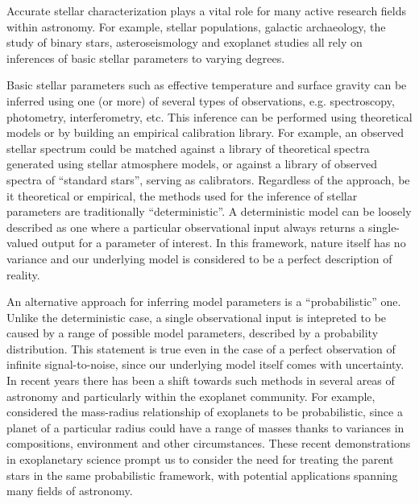 


Accurate stellar characterization plays a vital role for many active research
fields within astronomy.
For example, stellar populations, galactic archaeology, the study of binary
stars, asteroseismology and exoplanet studies all rely on inferences of basic
stellar parameters to varying degrees.

Basic stellar parameters such as effective temperature and surface gravity
can be inferred using one (or more) of several types of observations, e.g.
spectroscopy, photometry, interferometry, etc.
This inference can be performed using theoretical models or by building an
empirical calibration library.
For example, an observed stellar spectrum could be matched against a library of
theoretical spectra generated using stellar atmosphere models, or against a
library of observed spectra of ``standard stars'', serving as calibrators.
Regardless of the approach, be it theoretical or empirical, the methods used
for the inference of stellar parameters are traditionally ``deterministic''.
A deterministic model can be loosely described as one where a particular
observational input always returns a single-valued output for a parameter of
interest.
In this framework, nature itself has no variance and our underlying model is
considered to be a perfect description of reality.

An alternative approach for inferring model parameters is a ``probabilistic''
one.
Unlike the deterministic case, a single observational input is intepreted to be
caused by a range of possible model parameters, described by a probability
distribution.
This statement is true even in the case of a perfect observation of infinite
signal-to-noise, since our underlying model itself comes with uncertainty.
In recent years there has been a shift towards such methods in several areas of
 astronomy and particularly within the exoplanet community.
For example, \citet{wolfgang:2015} considered the mass-radius relationship
of exoplanets to be probabilistic, since a planet of a particular radius could
have a range of masses thanks to variances in compositions, environment and
other circumstances.
These recent demonstrations in exoplanetary science prompt us to consider the
need for treating the parent stars in the same probabilistic framework, with
potential applications spanning many fields of astronomy.

